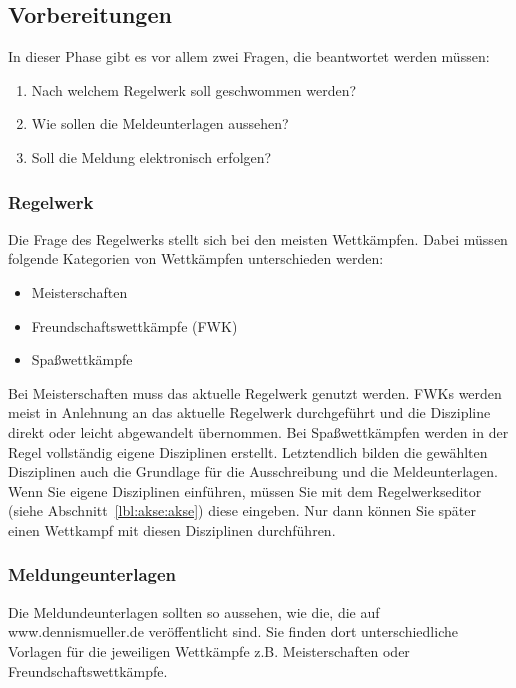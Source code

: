 \documentclass[11pt,a4paper,twoside,ngerman]{article}
\begin{document}
\newpage

\subsection{Vorbereitungen}
\label{lbl:vorbereitungen::begin}
In dieser Phase gibt es vor allem zwei Fragen, die beantwortet werden müssen:


\begin{enumerate}

\item Nach welchem Regelwerk soll geschwommen werden?


\item Wie sollen die Meldeunterlagen aussehen?


\item Soll die Meldung elektronisch erfolgen?


\end{enumerate}

\subsubsection*{Regelwerk}
Die Frage des Regelwerks stellt sich bei den meisten Wettkämpfen. Dabei müssen folgende Kategorien von Wettkämpfen unterschieden werden:


\begin{itemize}

\item Meisterschaften


\item Freundschaftswettkämpfe (FWK)


\item Spaßwettkämpfe


\end{itemize}
Bei Meisterschaften muss das aktuelle Regelwerk genutzt werden. FWKs werden meist in Anlehnung an das aktuelle Regelwerk durchgeführt und die Diszipline direkt oder leicht abgewandelt übernommen. Bei Spaßwettkämpfen werden in der Regel vollständig eigene Disziplinen erstellt. Letztendlich bilden die gewählten Disziplinen auch die Grundlage für die Ausschreibung und die Meldeunterlagen. Wenn Sie eigene Disziplinen einführen, müssen Sie mit dem Regelwerkseditor (siehe Abschnitt~\ref{lbl:akse:akse}) diese eingeben. Nur dann können Sie später einen Wettkampf mit diesen Disziplinen durchführen.


\subsubsection*{Meldungeunterlagen}
Die Meldundeunterlagen sollten so aussehen, wie die, die auf www.dennismueller.de veröffentlicht sind. Sie finden dort unterschiedliche Vorlagen für die jeweiligen Wettkämpfe z.B. Meisterschaften oder Freundschaftswettkämpfe.
\end{document}
